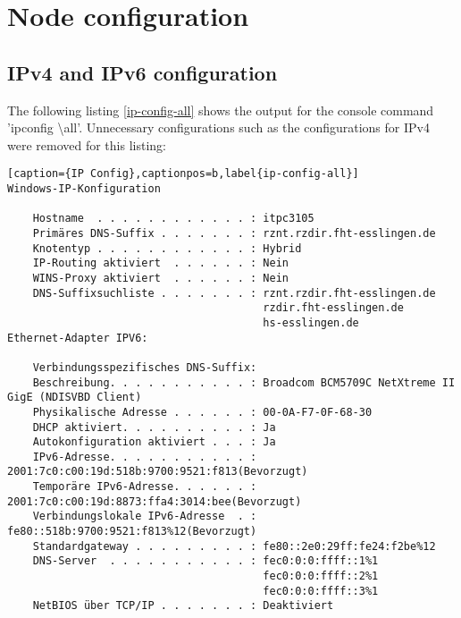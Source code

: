 \section{Node configuration}
\subsection{IPv4 and IPv6 configuration}
The following listing \ref{ip-config-all} shows the output for the console command 'ipconfig \textbackslash all'. Unnecessary configurations such as the configurations for IPv4 were removed for this listing:
\\ 
\begin{lstlisting}[caption={IP Config},captionpos=b,label{ip-config-all}]
Windows-IP-Konfiguration

	Hostname  . . . . . . . . . . . . : itpc3105
	Primäres DNS-Suffix . . . . . . . : rznt.rzdir.fht-esslingen.de
	Knotentyp . . . . . . . . . . . . : Hybrid
	IP-Routing aktiviert  . . . . . . : Nein
	WINS-Proxy aktiviert  . . . . . . : Nein
	DNS-Suffixsuchliste . . . . . . . : rznt.rzdir.fht-esslingen.de
										rzdir.fht-esslingen.de
										hs-esslingen.de
Ethernet-Adapter IPV6:

	Verbindungsspezifisches DNS-Suffix:
	Beschreibung. . . . . . . . . . . : Broadcom BCM5709C NetXtreme II GigE (NDISVBD Client)
	Physikalische Adresse . . . . . . : 00-0A-F7-0F-68-30
	DHCP aktiviert. . . . . . . . . . : Ja
	Autokonfiguration aktiviert . . . : Ja
	IPv6-Adresse. . . . . . . . . . . : 2001:7c0:c00:19d:518b:9700:9521:f813(Bevorzugt)
	Temporäre IPv6-Adresse. . . . . . : 2001:7c0:c00:19d:8873:ffa4:3014:bee(Bevorzugt)
	Verbindungslokale IPv6-Adresse  . : fe80::518b:9700:9521:f813%12(Bevorzugt)
	Standardgateway . . . . . . . . . : fe80::2e0:29ff:fe24:f2be%12
	DNS-Server  . . . . . . . . . . . : fec0:0:0:ffff::1%1
										fec0:0:0:ffff::2%1
										fec0:0:0:ffff::3%1
	NetBIOS über TCP/IP . . . . . . . : Deaktiviert
\end{lstlisting}
